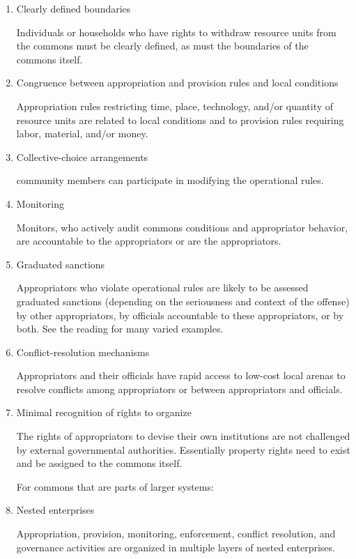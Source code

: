 \documentclass{article}
\begin{document}
\begin{enumerate}

\item {Clearly defined boundaries}

Individuals or households who have rights to withdraw resource units from the commons must be clearly defined, as must the boundaries of the commons itself.


\item{ Congruence between appropriation and provision rules and local conditions}

 Appropriation rules restricting time, place, technology, and/or quantity of resource units are related to local conditions and to provision rules requiring labor, material, and/or money.


\item{Collective-choice arrangements}

community members can participate in modifying the operational rules.


\item{Monitoring}

Monitors, who actively audit commons conditions and appropriator behavior, are accountable to the appropriators or are the appropriators.


\item{Graduated sanctions}

Appropriators who violate operational rules are likely to be assessed graduated sanctions (depending on the seriousness and context of the offense) by other appropriators, by officials accountable to these appropriators, or by both. See the reading for many varied examples. 


\item{Conflict-resolution mechanisms}

Appropriators and their officials have rapid access to low-cost local arenas to resolve conflicts among appropriators or between appropriators and officials.



\item{Minimal recognition of rights to organize}

The rights of appropriators to devise their own institutions are not challenged by external governmental authorities. Essentially property rights need to exist and be assigned to the commons itself. 

For commons that are parts of larger systems:

\item{Nested enterprises}

Appropriation, provision, monitoring, enforcement, conflict resolution, and governance activities are organized in multiple layers of nested enterprises.

\end{enumerate}
\end{document}
